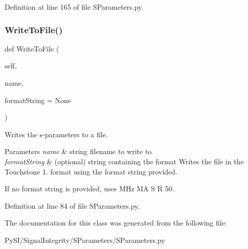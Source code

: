 Definition at line 165 of file S\+Parameters.\+py.

\mbox{\label{classSignalIntegrity_1_1SParameters_1_1SParameters_1_1SParameters_add396ed0a719fa2c93037bc8486d2ff1}} 
\subsubsection{\texorpdfstring{Write\+To\+File()}{WriteToFile()}}
{\footnotesize\ttfamily def Write\+To\+File (\begin{DoxyParamCaption}\item[{}]{self,  }\item[{}]{name,  }\item[{}]{format\+String = {\ttfamily None} }\end{DoxyParamCaption})}



Writes the s-\/parameters to a file. 


\begin{DoxyParams}{Parameters}
{\em name} & string filename to write to \\
\hline
{\em format\+String} & (optional) string containing the format Writes the file in the Touchstone 1. format using the format string provided.\\
\hline
\end{DoxyParams}
If no format string is provided, uses \textquotesingle{} M\+Hz MA S R 50.\textquotesingle{} 

Definition at line 84 of file S\+Parameters.\+py.



The documentation for this class was generated from the following file\+:\begin{DoxyCompactItemize}
\item 
Py\+S\+I/\+Signal\+Integrity/\+S\+Parameters/S\+Parameters.\+py\end{DoxyCompactItemize}
